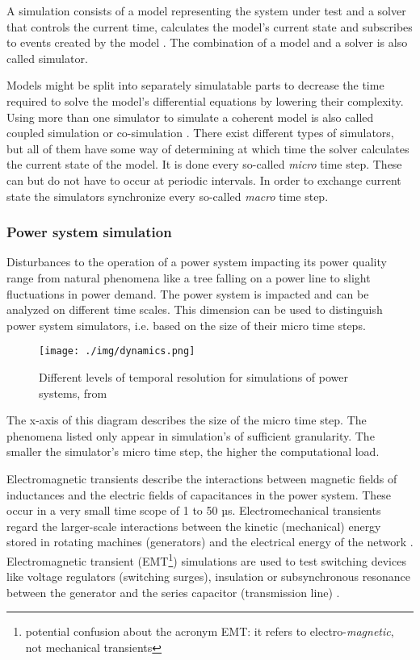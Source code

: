 \documentclass[a4paper,ngerman]{atseminar}
\begin{document}
A simulation consists of a model representing the system under test and a solver that controls the current time, calculates the model's current state and subscribes to events created by the model \cite{palensky2017}. The combination of a model and a solver is also called simulator.

Models might be split into separately simulatable parts to decrease the time required to solve the model's differential equations by lowering their complexity. Using more than one simulator to simulate a coherent model is also called coupled simulation or co-simulation \cite{palensky2017}. There exist different types of simulators, but all of them have some way of determining at which time the solver calculates the current state of the model. It is done every so-called \textit{micro} time step. These can but do not have to occur at periodic intervals. In order to exchange current state the simulators synchronize every so-called \textit{macro} time step.

\subsubsection{Power system simulation}
\label{MH:sec:bg:power-sim}

Disturbances to the operation of a power system impacting its power quality range from natural phenomena like a tree falling on a power line to slight fluctuations in power demand. The power system is impacted and can be analyzed on different time scales. This dimension can be used to distinguish power system simulators, i.e. based on the size of their micro time steps.

\begin{figure}[h]
 \centering
  \texttt{[image: ./img/dynamics.png]}
    \caption{Different levels of temporal resolution for simulations of power systems, from \cite{sauer1998}}
 \label{MH:fig:dynamics}
\end{figure}

The x-axis of this diagram describes the size of the micro time step. The phenomena listed only appear in simulation's of sufficient granularity. The smaller the simulator's micro time step, the higher the computational load. 

Electromagnetic transients describe the interactions between magnetic fields of inductances and the electric fields of capacitances in the power system. These occur in a very small time scope of 1 to 50 µs. Electromechanical transients regard the larger-scale interactions between the kinetic (mechanical) energy stored in rotating machines (generators) and the electrical energy of the network \cite{watson2003}.
Electromagnetic transient (EMT\footnote{potential confusion about the acronym EMT: it refers to electro-\textit{magnetic}, not mechanical transients}) simulations are used to test switching devices like voltage regulators (switching surges), insulation or subsynchronous resonance between the generator and the series capacitor (transmission line) \cite{sauer1998}.
\end{document}
